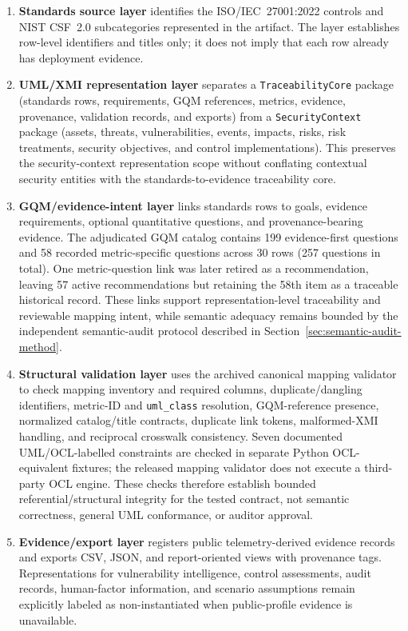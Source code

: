\documentclass[12pt,a4paper]{article}
\begin{document}
\begin{enumerate}[label=\arabic*),leftmargin=*]
  \item \textbf{Standards source layer} identifies the ISO/IEC~27001:2022 controls and NIST CSF~2.0 subcategories represented in the artifact. The layer establishes row-level identifiers and titles only; it does not imply that each row already has deployment evidence.

  \item \textbf{UML/XMI representation layer} separates a \texttt{TraceabilityCore} package (standards rows, requirements, GQM references, metrics, evidence, provenance, validation records, and exports) from a \texttt{SecurityContext} package (assets, threats, vulnerabilities, events, impacts, risks, risk treatments, security objectives, and control implementations). This preserves the security-context representation scope without conflating contextual security entities with the standards-to-evidence traceability core.

  \item \textbf{GQM/evidence-intent layer} links standards rows to goals, evidence requirements, optional quantitative questions, and provenance-bearing evidence. The adjudicated GQM catalog contains 199 evidence-first questions and 58 recorded metric-specific questions across 30 rows (257 questions in total). One metric-question link was later retired as a recommendation, leaving 57 active recommendations but retaining the 58th item as a traceable historical record. These links support representation-level traceability and reviewable mapping intent, while semantic adequacy remains bounded by the independent semantic-audit protocol described in Section~\ref{sec:semantic-audit-method}.

  \item \textbf{Structural validation layer} uses the archived canonical mapping validator to check mapping inventory and required columns, duplicate/dangling identifiers, metric-ID and \texttt{uml\_class} resolution, GQM-reference presence, normalized catalog/title contracts, duplicate link tokens, malformed-XMI handling, and reciprocal crosswalk consistency. Seven documented UML/OCL-labelled constraints are checked in separate Python OCL-equivalent fixtures; the released mapping validator does not execute a third-party OCL engine. These checks therefore establish bounded referential/structural integrity for the tested contract, not semantic correctness, general UML conformance, or auditor approval.

  \item \textbf{Evidence/export layer} registers public telemetry-derived evidence records and exports CSV, JSON, and report-oriented views with provenance tags. Representations for vulnerability intelligence, control assessments, audit records, human-factor information, and scenario assumptions remain explicitly labeled as non-instantiated when public-profile evidence is unavailable.
\end{enumerate}
\end{document}
